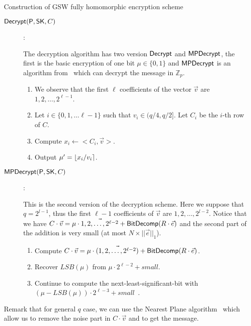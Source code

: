 \begin{section}{Construction of GSW fully homomorphic encryption scheme}
\begin{description}
  \item[${\mathsf{Decrypt}}(\mathsf{P}, \mathsf{SK}, C)$]:
    
    The decryption algorithm has two version ${\mathsf{Decrypt}}$ and ${\mathsf{MPDecrypt}}$, the first is the basic encryption of one bit $\mu \in \{0,1\}$ and ${\mathsf{MPDecrypt}}$ is an algorithm from~\cite{DBLP:conf/eurocrypt/MicciancioP12} which can decrypt the message in $\mathbb{Z}_p$.
    \begin{enumerate}
    \item We observe that the first $\ell$ coefficients of the vector $\vec{v}$ are $1, 2, \dots , 2^{\ell-1}$.
    \item Let $i \in \{0,1, \dots \ell-1\}$ such that $v_i \in (q/4, q/2]$. Let $C_i$ be the $i$-th row of $C$.
    \item Compute $x_i \gets <C_i, \vec{v}>$.
    \item Output $\mu' = \lfloor x_i/v_i\rceil$.
    \end{enumerate}
    

  \item[${\mathsf{MPDecrypt}}(\mathsf{P}, \mathsf{SK}, C)$]:
    
    This is the second version of the decryption scheme. Here we suppose that $q = 2^{l-1}$, thus the first $\ell - 1$ coefficients  of $\vec{v}$ are $1, 2, \dots, 2^{l-2}$. Notice that we have $C \cdot \vec{v} = \mu \cdot \vec{1, 2, \dots, 2^{\ell-2}} + {\mathsf{BitDecomp}}(R \cdot \vec{e})$ and the second part of the addition is very small (at most $N \times ||\vec{e}||_1$).
    \begin{enumerate}
    \item Compute $C \cdot \vec{v} = \mu \cdot \vec{(1, 2, \dots, 2^{\ell-2})} + {\mathsf{BitDecomp}}(R \cdot \vec{e})$.
    \item Recover $LSB(\mu)$ from $\mu \cdot 2^{\ell-2} + small$.
    \item Continue to compute the next-least-significant-bit with $(\mu - LSB(\mu)) \cdot 2^{\ell-3} + small$~\etc.
    \end{enumerate}
  \end{description}

  Remark that for general $q$ case, we can use the Nearest Plane algorithm~\cite{DBLP:journals/combinatorica/Babai86} which allow us to remove the noise part in $C \cdot \vec{v}$ and to get the message.


\end{section}
